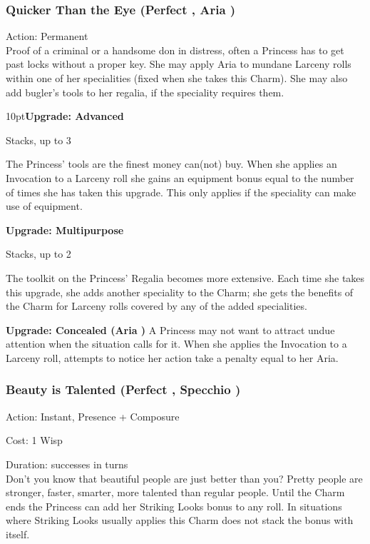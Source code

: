 \subsubsection*{Quicker Than the Eye (Perfect \textbullet, Aria \textbullet)}

\noindent Action: Permanent\\

\noindent Proof of a criminal or a handsome don in distress, often a Princess has to get past locks without a proper key. She may apply Aria to mundane Larceny rolls within one of her specialities (fixed when she takes this Charm). She may also add bugler’s tools to her regalia, if the speciality requires them.

\begin{myindentpar}{10pt}\textbf{Upgrade: Advanced}

Stacks, up to 3

The Princess' tools are the finest money can(not) buy. When she applies an Invocation to a Larceny roll she gains an equipment bonus equal to the number of times she has taken this upgrade. This only applies if the speciality can make use of equipment.

\textbf{Upgrade: Multipurpose}

Stacks, up to 2

The toolkit on the Princess’ Regalia becomes more extensive. Each time she takes this upgrade, she adds another speciality to the Charm; she gets the benefits of the Charm for Larceny rolls covered by any of the added specialities. 

\textbf{Upgrade: Concealed (Aria \textbullet\textbullet)}
A Princess may not want to attract undue attention when the situation calls for it. When she applies the Invocation to a Larceny roll, attempts to notice her action take a penalty equal to her Aria. \end{myindentpar}

\subsubsection*{Beauty is Talented (Perfect \textbullet, Specchio \textbullet)}

\noindent Action: Instant, Presence + Composure

\noindent Cost: 1 Wisp

\noindent Duration: successes in turns \\

\noindent Don't you know that beautiful people are just better than you? Pretty people are stronger, faster, smarter, more talented than regular people. Until the Charm ends the Princess can add her Striking Looks bonus to any roll. In situations where Striking Looks usually applies this Charm does not stack the bonus with itself.

